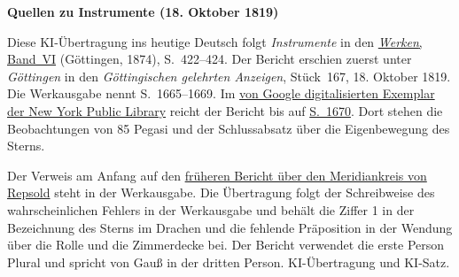 \clearpage\thispagestyle{empty}
\begin{center}\textbf{Quellen zu Instrumente (18. Oktober 1819)}\end{center}
\noindent Diese KI-Übertragung ins heutige Deutsch folgt \textit{Instrumente} in den \href{https://gdz.sub.uni-goettingen.de/id/PPN236007467}{\textit{Werken}, Band~VI} (Göttingen, 1874), S.~422--424. Der Bericht erschien zuerst unter \textit{Göttingen} in den \textit{Göttingischen gelehrten Anzeigen}, Stück~167, 18. Oktober 1819. Die Werkausgabe nennt S.~1665--1669. Im \href{https://books.google.com/books?id=SggWAAAAYAAJ&pg=PA1665}{von Google digitalisierten Exemplar der New York Public Library} reicht der Bericht bis auf \href{https://books.google.com/books?id=SggWAAAAYAAJ&pg=PA1670}{S.~1670}. Dort stehen die Beobachtungen von 85 Pegasi und der Schlussabsatz über die Eigenbewegung des Sterns.
\par\smallskip\noindent Der Verweis am Anfang auf den \hyperlink{native-415}{früheren Bericht über den Meridiankreis von Repsold} steht in der Werkausgabe. Die Übertragung folgt der Schreibweise des wahrscheinlichen Fehlers in der Werkausgabe und behält die Ziffer 1 in der Bezeichnung des Sterns im Drachen und die fehlende Präposition in der Wendung über die Rolle und die Zimmerdecke bei. Der Bericht verwendet die erste Person Plural und spricht von Gauß in der dritten Person. KI-Übertragung und KI-Satz.
\clearpage
